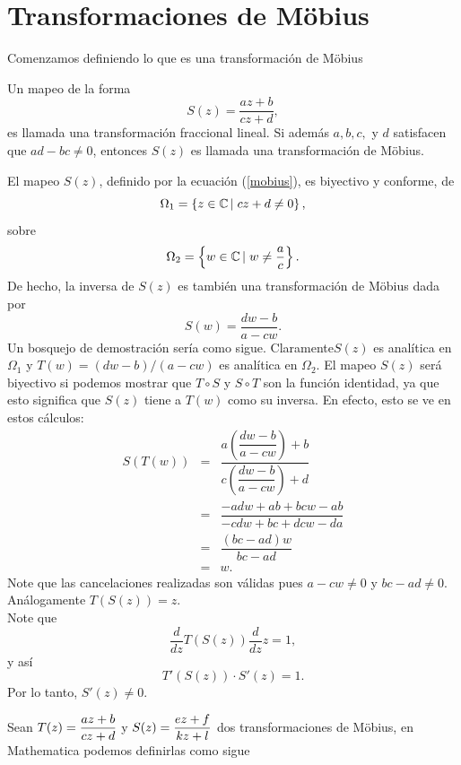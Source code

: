 \section{Transformaciones de Möbius} \label{Möbius}

Comenzamos definiendo lo que es una transformación de Möbius
\begin{defi}
	Un mapeo de la forma 
	\begin{equation}\label{mobius}
		S(z)=\dfrac{az+b}{cz+d},
	\end{equation}
	 es llamada una transformación fraccional lineal. Si  además $a, b, c,$ y $d$ satisfacen que $ad-bc\neq 0$, entonces $S(z)$ es llamada una  transformación de Möbius.
\end{defi}

\begin{prop}\label{prop3}
	El mapeo $S(z)$, definido por la ecuación (\ref{mobius}), es biyectivo y conforme, de
	$$\Omega_{1}=\left\{z\in\mathbb{C} \left|\right. cz+d\neq 0\right\},$$
	sobre 
	$$\Omega_{2}=\left\{w\in\mathbb{C} \left|\right. w\neq \dfrac{a}{c}\right\}.$$
	De hecho, la inversa de $S(z)$ es también una transformación de Möbius dada por
	\begin{equation}\label{invMobius}
		S(w)=\dfrac{dw-b}{a-cw}.
	\end{equation}
Un bosquejo de demostración sería como sigue. Claramente$S(z)$ es analítica en $\Omega_{1}$ y $T(w) = (dw - b)/(a-cw)$ es
analítica en $\Omega_{2}$. El mapeo $S(z)$ será biyectivo si podemos mostrar que $T \circ S$ y $S \circ T$ son la función identidad, ya que esto significa que $S(z)$ tiene a $T(w)$ como su inversa. En efecto, esto se ve en estos cálculos:
\[
\begin{array}{ccl}
	S(T(w))&=&\dfrac{a\left(\dfrac{dw-b}{a-cw} \right) +b}{c\left(\dfrac{dw-b}{a-cw}\right)+d}\\
	&=&\dfrac{-adw+ab+bcw-ab}{-cdw+bc+dcw-da}\\
	&=&\dfrac{(bc-ad)w}{bc-ad}\\
	&=&w.
\end{array}
\]
Note que las cancelaciones realizadas son válidas pues $a-cw\neq  0$ y $bc-ad\neq 0$. Análogamente $T(S(z)) =z$.\\ 
Note que 
$$\dfrac{d}{dz}T(S(z))\dfrac{d}{dz}z=1,$$
y así $$T'(S(z))\cdot S'(z)=1.$$
Por lo tanto, $S'(z)\neq 0$.
\end{prop}
Sean $T(z)=\dfrac{az+b}{cz+d}$ y $S(z)=\dfrac{ez+f}{kz+l}$ dos transformaciones de M\"obius, en Mathematica podemos definirlas como sigue

